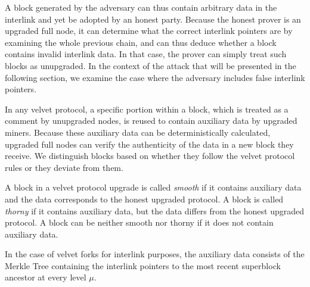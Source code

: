 A block generated by the adversary can thus contain arbitrary data in the
interlink and yet be adopted by an honest party. Because the honest prover is an
upgraded full node, it can determine what the correct interlink pointers are by
examining the whole previous chain, and can thus deduce whether a block contains
invalid interlink data. In that case, the prover can simply treat such blocks as
unupgraded. In the context of the attack that will be presented in the following
section, we examine the case where the adversary includes false interlink
pointers.

In any velvet protocol, a specific portion within a block, which is treated as
a comment by unupgraded nodes, is reused to contain auxiliary data by upgraded
miners. Because these auxiliary data can be deterministically calculated,
upgraded full nodes can verify the authenticity of the data in a new block they
receive. We distinguish blocks based on whether they follow the velvet protocol
rules or they deviate from them.

\begin{definition}
A block in a velvet protocol upgrade is called \emph{smooth} if it contains
auxiliary data and the data corresponds to the honest upgraded protocol. A block
is called \emph{thorny} if it contains auxiliary data, but the data differs from
the honest upgraded protocol. A block can be neither smooth nor thorny if it
does not contain auxiliary data.
\end{definition}

In the case of velvet forks for interlink purposes, the auxiliary data consists
of the Merkle Tree containing the interlink pointers to the most recent
superblock ancestor at every level $\mu$.